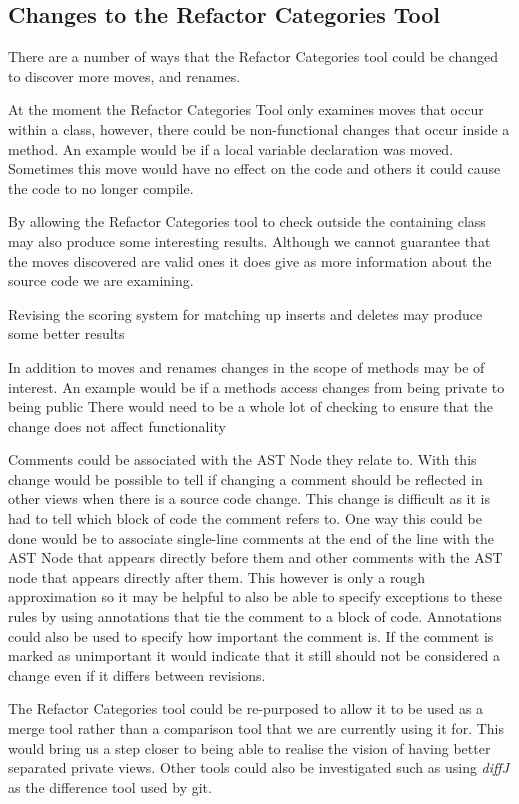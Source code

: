 \subsection{Changes to the Refactor Categories Tool}
There are a number of ways that the Refactor Categories tool could be changed to discover more moves, and renames.

At the moment the Refactor Categories Tool only examines moves that occur within a class, however, there could be non-functional changes that occur inside a method. 
An example would be if a local variable declaration was moved.
Sometimes this move would have no effect on the code and others it could cause the code to no longer compile.

By allowing the Refactor Categories tool to check outside the containing class may also produce some interesting results.
Although we cannot guarantee that the moves discovered are valid ones it does give as more information about the source code we are examining.

Revising the scoring system for matching up inserts and deletes may produce some better results

In addition to moves and renames changes in the scope of methods may be of interest.
An example would be if a methods access changes from being private to being public
There would need to be a whole lot of checking to ensure that the change does not affect functionality

Comments could be associated with the AST Node they relate to.  
With this change would be possible to tell if changing a comment should be reflected in other views when there is a source code change. 
This change is difficult as it is had to tell which block of code the comment refers to.  
One way this could be done would be to associate single-line comments at the end of the line with the AST Node that appears directly before them and other comments with the AST node that appears directly after them.  
This however is only a rough approximation so it may be helpful to also be able to specify exceptions to these rules by using annotations that tie the comment to a block of code. Annotations could also be used to specify how important the comment is.
If the comment is marked as unimportant it would indicate that it still should not be considered a change even if it differs between revisions.

The Refactor Categories tool could be re-purposed to allow it to be used as a merge tool rather than a comparison tool that we are currently using it for.  This would bring us a step closer to being able to realise the vision of having better separated private views.  Other tools could also be investigated such as using \emph{diffJ} as the difference tool used by git.

